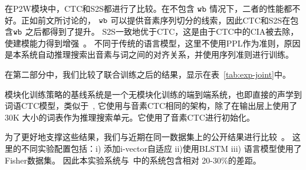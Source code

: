 在P2W模块中，CTC和S2S都进行了比较。在不包含 $\tt wb$ 情况下，二者的性能都不好。正如前文所讨论的， $\tt wb$ 可以提供音素序列切分的线索，因此CTC和S2S在包含$\tt wb$ 之后都得到了提升。
S2S一致地优于CTC，这是由于CTC中的CIA被去除，使建模能力得到增强~\cite{chan2016end}。 
不同于传统的语言模型，这里不使用PPL作为准则，原因是本系统自动推理搜索出音素与词之间的对齐关系，并使用序列准则进行训练。



在第二部分中，我们比较了联合训练之后的结果，显示在表~\ref{tab:exp-joint}中。

模块化训练策略的基线系统是一个无模块化训练的端到端系统，也即直接的声学到词语CTC模型，类似于~\cite{audhkhasi2017direct}, 它使用与音素CTC相同的架构，除了在输出层上使用了 30K 大小的词表作为推理搜索单元。它使用了音素CTC进行初始化。

为了更好地支撑这些结果，我们与近期在同一数据集上的公开结果进行比较~\cite{audhkhasi2017direct}。 
这里的不同实验配置包括：i) 添加i-vector自适应 ii)使用BLSTM iii) 语言模型使用了Fisher数据集。
因此本实验系统与~\cite{audhkhasi2017direct}中的系统包含相对 20-30\%的差距。 

